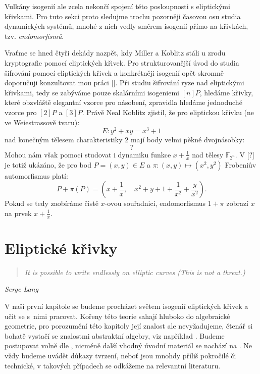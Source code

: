 \documentclass[12pt]{report}
\begin{document}
Vulkány isogenií ale zcela nekončí spojení této posloupnosti s eliptickými křivkami. Pro tuto sekci proto sledujme trochu pozorněji časovou osu studia dynamických systémů, mnohé z nich vedly směrem isogenií přímo na křivkách, tzv. \textit{endomorfismů}.

Vraťme se hned čtyři dekády nazpět, kdy Miller a Koblitz stáli u zrodu kryptografie pomocí eliptických křivek. Pro strukturovanější úvod do studia šifrování pomocí eliptických křivek a konkrétněji isogenií opět skromně doporučuji konzultovat mou práci []. Při studiu šifrování ryze nad eliptickými křivkami, tedy se zabýváme pouze skalárními isogeniemi $[n]P$, hledáme křivky, které obzvláště elegantní vzorce pro násobení, zpravidla hledáme jednoduché vzorce pro $[2]P$ a $[3]P$. Právě Neal Koblitz zjistil, že pro eliptickou křivku (ne ve Weiestrassově tvaru):
$$E : y^2 + xy = x^3 + 1$$
nad konečným tělesem charakteristiky $2$ mají body velmi pěkné dvojnásobky:
$$?$$ 
Mohou nám však pomoci studovat i dynamiku funkce $x + \frac{1}{x}$ nad tělesy $\mathbb{F}_{2^n}$. V [?] je totiž ukázáno, že pro bod $P = (x,y) \in E$ a $\pi : (x,y) \longmapsto (x^2,y^2)$ Frobeniův automorfismus platí:
$$P + \pi (P) = \left(x + \frac{1}{x} , \quad x^2 + y + 1 + \frac{1}{x^2} + \frac{y}{x^2} \right).$$
Pokud se tedy zaobíráme čistě $x$-ovou souřadnicí, endomorfismus $1+\pi$ zobrazí $x$ na prvek $x+\frac{1}{x}$.
\chapter{Eliptické křivky}


\begin{center}
\begin{verse}
\textit{It is possible to write endlessly on elliptic curves (This is not a threat.)}
\end{verse}
\hfill \textit{Serge Lang}
\end{center}

V naší první kapitole se budeme procházet světem isogenií eliptických křivek a učit se s~nimi pracovat. Kořeny této teorie sahají hluboko do algebraické geometrie, pro porozumění této kapitoly její znalost ale nevyžadujeme, čtenář si bohatě vystačí se znalostmi abstraktní algebry, viz například \cite{Rosicky}. Budeme postupovat volně dle \cite{Sutherland}, nicméně další vhodný úvodní materiál se nachází na \cite{DeFeo2}. Ne vždy budeme uvádět důkazy tvrzení, neboť jsou mnohdy příliš pokročilé či technické, v takových případech se odkážeme na relevantní literaturu. 
\end{document}

